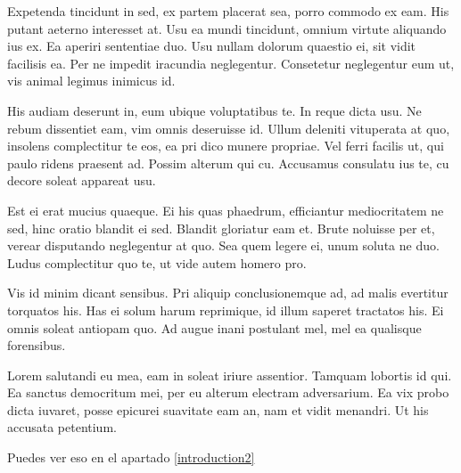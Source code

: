 \documentclass[a4paper, 11pt, titlepage, twocolumn]{book}
\begin{document}
Expetenda tincidunt in sed, ex partem placerat sea, porro commodo ex eam. His putant aeterno interesset at. Usu ea mundi tincidunt, omnium virtute aliquando ius ex. Ea aperiri sententiae duo. Usu nullam dolorum quaestio ei, sit vidit facilisis ea. Per ne impedit iracundia neglegentur. Consetetur neglegentur eum ut, vis animal legimus inimicus id.

His audiam deserunt in, eum ubique voluptatibus te. In reque dicta usu. Ne rebum dissentiet eam, vim omnis deseruisse id. Ullum deleniti vituperata at quo, insolens complectitur te eos, ea pri dico munere propriae. Vel ferri facilis ut, qui paulo ridens praesent ad. Possim alterum qui cu. Accusamus consulatu ius te, cu decore soleat appareat usu.

Est ei erat mucius quaeque. Ei his quas phaedrum, efficiantur mediocritatem ne sed, hinc oratio blandit ei sed. Blandit gloriatur eam et. Brute noluisse per et, verear disputando neglegentur at quo. Sea quem legere ei, unum soluta ne duo. Ludus complectitur quo te, ut vide autem homero pro.

Vis id minim dicant sensibus. Pri aliquip conclusionemque ad, ad malis evertitur torquatos his. Has ei solum harum reprimique, id illum saperet tractatos his. Ei omnis soleat antiopam quo. Ad augue inani postulant mel, mel ea qualisque forensibus.

Lorem salutandi eu mea, eam in soleat iriure assentior. Tamquam lobortis id qui. Ea sanctus democritum mei, per eu alterum electram adversarium. Ea vix probo dicta iuvaret, posse epicurei suavitate eam an, nam et vidit menandri. Ut his accusata petentium.

Puedes ver eso en el apartado \ref{introduction2}  
\end{document}
